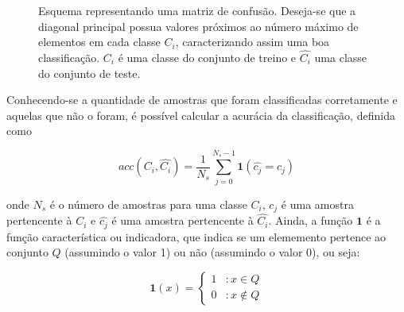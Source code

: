 \begin{figure}[ht!]
\begin{center}

\caption{\label{fig:confusa} Esquema representando uma matriz de
  confusão. Deseja-se que a diagonal principal possua valores próximos
  ao número máximo de elementos em cada classe $C_i$, caracterizando
  assim uma boa classificação. $C_i$ é uma classe do conjunto de
  treino e $\hat{C_i}$ uma classe do conjunto de teste.}
\end{center}
\end{figure}

Conhecendo-se a quantidade de amostras que foram classificadas corretamente e aquelas que não o foram, é possível calcular a acurácia da classificação, definida como

\begin{equation}
  acc(C_i, \hat{C_i}) = \frac{1}{N_s} \sum_{j=0}^{N_s-1} \textbf{1}(\hat{c_j} = c_j)
\end{equation}

\noindent onde $N_s$ é o número de amostras para uma classe $C_i$,
$c_j$ é uma amostra pertencente à $C_i$ e $\hat{c_j}$ é uma amostra
pertencente à $\hat{C_i}$. Ainda, a função $\textbf{1}$ é a função
característica ou indicadora, que indica se um elememento pertence ao
conjunto $Q$ (assumindo o valor 1) ou não (assumindo o valor 0), ou
seja:

\begin{equation}
  \textbf{1}(x) = \left\{
     \begin{array}{lr}
       1 & : x \in Q \\
       0 & : x \notin Q
     \end{array}
   \right.
\end{equation}

